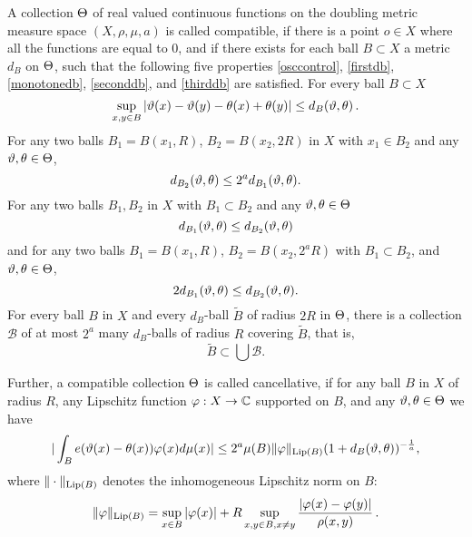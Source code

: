A collection ${\Theta}$ of real valued continuous functions on the doubling metric measure space $(X,\rho,\mu,a)$ is called compatible,
if there is a point $o\in X$ where all the functions are equal to $0$,
and if there exists for each ball $B \subset X$ a metric $d_B$ on ${\Theta}$,
such that the following five properties \eqref{osccontrol}, \eqref{firstdb}, \eqref{monotonedb}, \eqref{seconddb}, and \eqref{thirddb} are satisfied.
For every ball $B \subset X$
\begin{equation}\label{osccontrol}
    \sup_{x,y\in B}|{\vartheta}(x)-{{\vartheta}(y)}- {\theta}(x)+{{\theta}(y)}| \le d_{B}({\vartheta},{\theta})\,.
\end{equation}
For any two balls $B_1=B(x_1,R)$, $B_2= B(x_2,2R)$ in $X$ with $x_1\in B_2$ and any ${\vartheta},{\theta}\in {\Theta}$,
\begin{equation}\label{firstdb}
    d_{B_2}({\vartheta},{\theta})\le 2^a d_{B_1}({\vartheta},{\theta}) .
\end{equation}
For any two balls $B_1, B_2$ in $X$ with $B_1 \subset B_2$ and any ${\vartheta}, {\theta} \in {\Theta}$
\begin{equation}\label{monotonedb}
    d_{B_1}({\vartheta},{\theta}) \le d_{B_2}({\vartheta}, {\theta})
\end{equation}
and for any two balls
$B_1=B(x_1,R)$, $B_2= B(x_2,2^aR)$
with $B_1\subset B_2$, and ${\vartheta},{\theta}\in {\Theta}$,
\begin{equation}\label{seconddb}
    2d_{B_1}({\vartheta},{\theta})
\le d_{B_2}({\vartheta},{\theta}) .
\end{equation}
For every ball $B$ in $X$ and every $d_B$-ball $\tilde B$ of radius $2R$ in ${\Theta}$, there is a collection $\mathcal{B}$ of
at most $2^a$ many $d_B$-balls of radius $R$ covering $\tilde B$, that is,
\begin{equation}\label{thirddb}
    \tilde B\subset \bigcup \mathcal{B}.
\end{equation}


Further, a compatible collection ${\Theta}$ is called cancellative, if
for any ball $B$ in $X$ of radius $R$, any Lipschitz function $\varphi: X\to \mathbb{C}$
supported on $B$, and any ${\vartheta},{\theta}\in {\Theta}$ we have
\begin{equation}
    \label{eq-vdc-cond}
    |\int_B e({\vartheta}(x)-{{\theta}(x)}) \varphi(x) d\mu(x)|\le 2^a \mu(B)\|\varphi\|_{\operatorname{\operatorname{Lip}}(B)}
(1+d_B({\vartheta},{\theta}))^{-\frac{1}{a}},
\end{equation}
where $\|\cdot\|_{\operatorname{\operatorname{Lip}}(B)}$ denotes the inhomogeneous Lipschitz norm on $B$:
$$
    \|\varphi\|_{\operatorname{\operatorname{Lip}}(B)} = \sup_{x \in B} |\varphi(x)| + R \sup_{x,y \in B, x \neq y} \frac{|\varphi(x) - \varphi(y)|}{\rho(x,y)}\,.
$$


